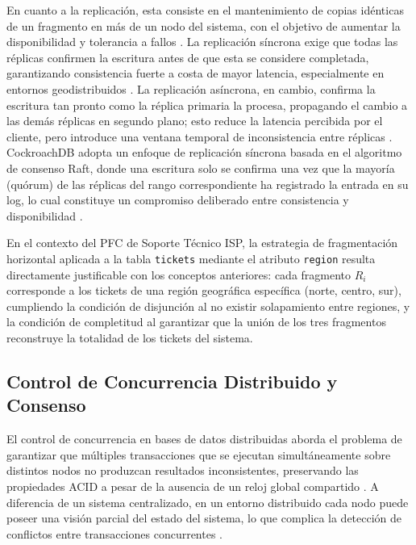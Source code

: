 \documentclass[12pt, a4paper]{article}
\begin{document}
En cuanto a la replicación, esta consiste en el mantenimiento de copias idénticas de un fragmento en más de un nodo del sistema, con el objetivo de aumentar la disponibilidad y tolerancia a fallos \cite{kleppmann2017designing}. La replicación síncrona exige que todas las réplicas confirmen la escritura antes de que esta se considere completada, garantizando consistencia fuerte a costa de mayor latencia, especialmente en entornos geodistribuidos \cite{viotti2016consistency}. La replicación asíncrona, en cambio, confirma la escritura tan pronto como la réplica primaria la procesa, propagando el cambio a las demás réplicas en segundo plano; esto reduce la latencia percibida por el cliente, pero introduce una ventana temporal de inconsistencia entre réplicas \cite{viotti2016consistency}. CockroachDB adopta un enfoque de replicación síncrona basada en el algoritmo de consenso Raft, donde una escritura solo se confirma una vez que la mayoría (quórum) de las réplicas del rango correspondiente ha registrado la entrada en su log, lo cual constituye un compromiso deliberado entre consistencia y disponibilidad \cite{taft2020cockroachdb}.

En el contexto del PFC de Soporte Técnico ISP, la estrategia de fragmentación horizontal aplicada a la tabla \texttt{tickets} mediante el atributo \texttt{region} resulta directamente justificable con los conceptos anteriores: cada fragmento $R_i$ corresponde a los tickets de una región geográfica específica (norte, centro, sur), cumpliendo la condición de disjunción al no existir solapamiento entre regiones, y la condición de completitud al garantizar que la unión de los tres fragmentos reconstruye la totalidad de los tickets del sistema.

\subsection{Control de Concurrencia Distribuido y Consenso}

El control de concurrencia en bases de datos distribuidas aborda el problema de garantizar que múltiples transacciones que se ejecutan simultáneamente sobre distintos nodos no produzcan resultados inconsistentes, preservando las propiedades ACID a pesar de la ausencia de un reloj global compartido \cite{ozsu2020principles}. A diferencia de un sistema centralizado, en un entorno distribuido cada nodo puede poseer una visión parcial del estado del sistema, lo que complica la detección de conflictos entre transacciones concurrentes \cite{steen2023distributed}.
\end{document}
